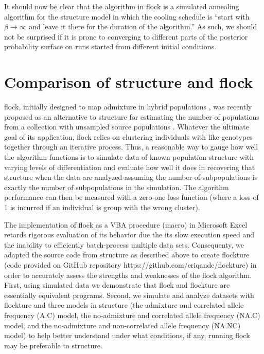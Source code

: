 It should now be clear that the algorithm in {\sc flock} is a simulated annealing 
algorithm for the {\sc structure} model in which the cooling schedule is
``start with $\beta\rightarrow\infty$ and leave it there for the duration of 
the algorithm.''  As such, we should not be surprised if it is prone 
to converging to different parts of the posterior probability surface on runs started
from different initial conditions.


\section*{Comparison of {\sc structure} and {\sc flock}}
{\sc flock}, initially designed to map admixture in hybrid populations 
\citep{Duc&Tur2009}, was recently proposed as an alternative to 
{\sc structure} for estimating the number of populations from a collection with 
unsampled source populations \citep{Duc&Tur2012}. Whatever the ultimate goal
of its application,  
{\sc flock} relies on clustering individuals with like genotypes together  
through an iterative process. Thus, a reasonable way 
to gauge how well the algorithm functions is to simulate data of known 
population structure with varying levels of differentiation and 
evaluate how well it does in recovering that structure when the data are
analyzed assuming
the number of subpopulations is exactly the number of subpopulations in the simulation. The 
algorithm performance can then be measured with a zero-one 
loss function (where a loss of 1 is incurred if an individual is group with the wrong cluster).

The implementation of {\sc flock} as a VBA procedure (macro) in 
Microsoft Excel retards rigorous evaluation of its behavior due 
the its slow execution speed and 
the inability to efficiently batch-process multiple data sets. Consequenty, we adapted 
the source code from {\sc structure} as described above to create {\sc flockture}
(code provided on GitHub repository https://github.com/eriqande/flockture) 
in order to accurately assess the strengths and weaknesses of the {\sc flock} 
algorithm. First, using simulated data we demonstrate that {\sc flock} 
and {\sc flockture} are essentially equivalent programs.
Second, we simulate and analyze datasets with {\sc flockture} 
and three models in {\sc structure} (the admixture and correlated 
allele frequency (A.C) model, the no-admixture and correlated 
allele frequency (NA.C) model, and the no-admixture and non-correlated 
allele frequency (NA.NC) model) to help better understand
under what conditions, if any, running {\sc flock} may be preferable to {\sc structure}. 

